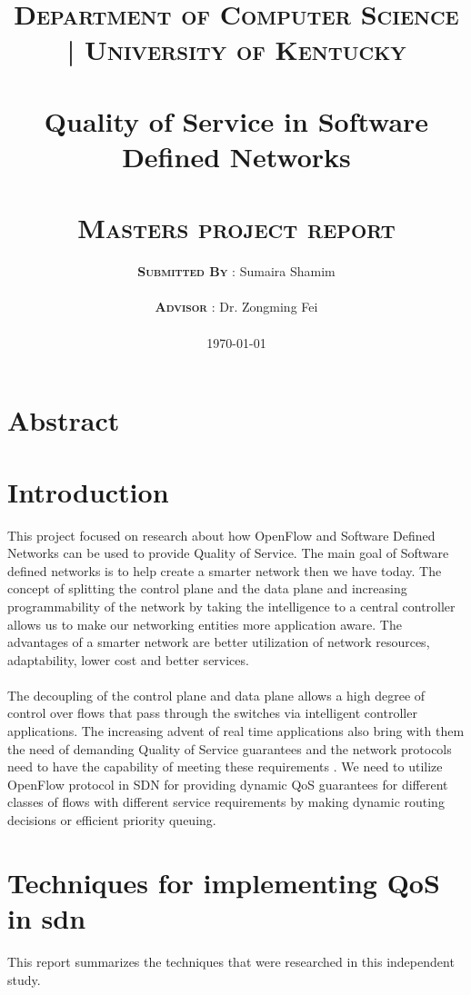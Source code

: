 \documentclass[paper=a4, fontsize=11pt]{scrartcl}	%
\title{
		\usefont{OT1}{bch}{b}{n}
		\normalfont \normalsize \textsc{\textbf{Department of Computer Science | University of Kentucky}} \\ [28pt]
		\horrule{0.5pt} \\[0.4cm]
		\huge Quality of Service in Software Defined Networks\\
		\horrule{2pt} \\[0.5cm]
		\normalfont \normalsize \textsc{\textbf{Masters project report}}
}
\author{
		\normalfont \normalsize \textsc{\textbf{Submitted By}} 
		\normalfont 								\normalsize
       	{: Sumaira Shamim}\\[-3pt]		\normalsize \\
       	\normalfont \normalsize \textsc{\textbf{Advisor}} 
       	\normalfont 								\normalsize
       	{: Dr. Zongming Fei}\\[-3pt]		\normalsize \\
  \today      
}
\date{}
\numberwithin{equation}{section}		%
\numberwithin{figure}{section}			%
\numberwithin{table}{section}				%
\begin{document}
\maketitle
\thispagestyle{empty}

\newpage
\setcounter{page}{1}
\section{Abstract}
\newpage
\tableofcontents
\newpage
\section{Introduction}
This project focused on research about how OpenFlow and Software Defined Networks can be used to provide Quality of Service. The main goal of Software defined networks is to help create a smarter network then we have today. The concept of splitting the control plane and the data plane and increasing programmability of the network by taking the intelligence to a central controller allows us to make our networking entities more application aware. The advantages of a smarter network are better utilization of network resources, adaptability, lower cost and better services. 
\\
\\
The decoupling of the control plane and data plane allows a high degree of control over flows that pass through the switches via intelligent controller applications. The increasing advent of real time applications also bring with them the need of demanding Quality of Service guarantees and the network protocols need to have the capability of meeting these requirements \cite{thesis}. We need to utilize OpenFlow protocol in SDN for providing dynamic QoS guarantees for different classes of flows with different service requirements by making dynamic routing decisions or efficient priority queuing. 
\section{Techniques for implementing QoS in sdn}
This report summarizes the techniques that were researched in this independent study.
\end{document}
